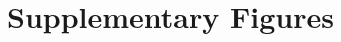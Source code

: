 \clearpage
\section*{Supplementary Figures}
\setcounter{figure}{0}
\renewcommand{\figurename}{Supplementary Figure}
\makeatletter
\newsavebox\suppfig@cap\newsavebox\suppfig@body\newdimen\suppfig@room
\newcommand\suppfig@caption[1]{\captionof{figure}{#1}%
  \global\let\suppfig@lbl\@currentlabel\ifdefined\@currentHref\global\let\suppfig@href\@currentHref\fi}
\newcommand\suppfig@setlabel{\let\@currentlabel\suppfig@lbl\ifdefined\@currentHref\let\@currentHref\suppfig@href\fi}
\newcommand\suppfig[2]{%
  \par\sbox\suppfig@cap{\parbox{\linewidth}{\suppfig@caption{#2}}}%
  \sbox\suppfig@body{\parbox{\linewidth}{\centering #1}}%
  \suppfig@room=\ifdim\pagegoal=\maxdimen\textheight\else\pagegoal\fi
  \advance\suppfig@room-\pagetotal \advance\suppfig@room-\ht\suppfig@cap \advance\suppfig@room-\dp\suppfig@cap
  \advance\suppfig@room-3\baselineskip
  \Gscale@div\@tempa{\suppfig@room}{\dimexpr\ht\suppfig@body+\dp\suppfig@body\relax}%
  \begin{center}\ifdim\@tempa\p@<\p@\scalebox{\@tempa}{\usebox\suppfig@body}\else\usebox\suppfig@body\fi\end{center}
  \noindent\usebox\suppfig@cap\par\suppfig@setlabel}
\newcommand\suppfigsplit[2]{%
  \par\sbox\suppfig@body{\parbox{\linewidth}{\centering #1}}%
  \suppfig@room=\ifdim\pagegoal=\maxdimen\textheight\else\pagegoal\fi
  \advance\suppfig@room-\pagetotal \advance\suppfig@room-2\baselineskip
  \Gscale@div\@tempa{\suppfig@room}{\dimexpr\ht\suppfig@body+\dp\suppfig@body\relax}%
  \begin{center}\ifdim\@tempa\p@<\p@\scalebox{\@tempa}{\usebox\suppfig@body}\else\usebox\suppfig@body\fi\end{center}
  \clearpage
  \noindent\parbox{\linewidth}{\suppfig@caption{#2}}\par\suppfig@setlabel}
\makeatother

